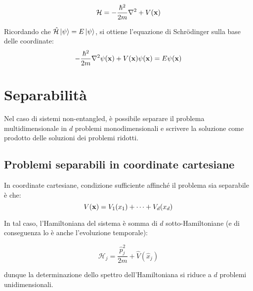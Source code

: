 \begin{equation}
	\mathcal{H} = - \frac{\hbar^2}{2m} \nabla^2 + V(\mathbf{x})
	\label{eq:7}
\end{equation}

Ricordando che $ \hat{\mathcal{H}}\ket{\psi} = E\ket{\psi} $, si ottiene l'equazione di Schrödinger sulla base delle coordinate:
\begin{equation}
	- \frac{\hbar^2}{2m} \nabla^2 \psi(\mathbf{x}) + V(\mathbf{x}) \psi(\mathbf{x}) = E \psi(\mathbf{x})
	\label{eq:8}
\end{equation}

\section{Separabilità}

Nel caso di sistemi non-entangled, è possibile separare il problema multidimensionale in $ d $ problemi monodimensionali e scrivere la soluzione come prodotto delle soluzioni dei problemi ridotti.

\subsection{Problemi separabili in coordinate cartesiane}

\begin{proposition}
	In coordinate cartesiane, condizione sufficiente affinché il problema sia separabile è che:
	\begin{equation}
		V(\mathbf{x}) = V_1(x_1) + \dots + V_d(x_d)
		\label{eq:9}
	\end{equation}
\end{proposition}

In tal caso, l'Hamiltoniana del sistema è somma di $ d $ sotto-Hamiltoniane (e di conseguenza lo è anche l'evoluzione temporale):

\begin{equation}
	\mathcal{H}_j = \frac{\hat{p}_j^2}{2m} + \hat{V}(\hat{x}_j)
	\label{eq:10}
\end{equation}

dunque la determinazione dello spettro dell'Hamiltoniana si riduce a $ d $ problemi unidimensionali.

